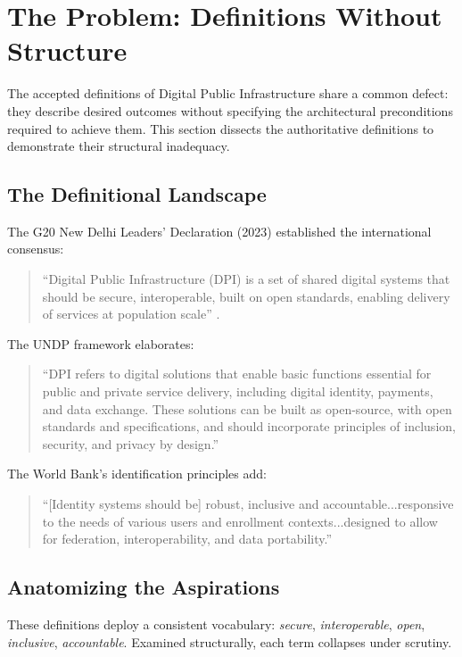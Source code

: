 \documentclass{article}
\begin{document}
\section{The Problem: Definitions Without Structure}
\label{sec:problem}

The accepted definitions of Digital Public Infrastructure share a common defect: they describe desired outcomes without specifying the architectural preconditions required to achieve them. This section dissects the authoritative definitions to demonstrate their structural inadequacy.

\subsection{The Definitional Landscape}

The G20 New Delhi Leaders' Declaration (2023) established the international consensus:

\begin{quote}
``Digital Public Infrastructure (DPI) is a set of shared digital systems that should be secure, interoperable, built on open standards, enabling delivery of services at population scale'' \citep{g20}.
\end{quote}

The UNDP framework \citep{undp} elaborates:

\begin{quote}
``DPI refers to digital solutions that enable basic functions essential for public and private service delivery, including digital identity, payments, and data exchange. These solutions can be built as open-source, with open standards and specifications, and should incorporate principles of inclusion, security, and privacy by design.''
\end{quote}

The World Bank's identification principles add:

\begin{quote}
``[Identity systems should be] robust, inclusive and accountable...responsive to the needs of various users and enrollment contexts...designed to allow for federation, interoperability, and data portability.''
\end{quote}

\subsection{Anatomizing the Aspirations}

These definitions deploy a consistent vocabulary: \textit{secure}, \textit{interoperable}, \textit{open}, \textit{inclusive}, \textit{accountable}. Examined structurally, each term collapses under scrutiny.
\end{document}
